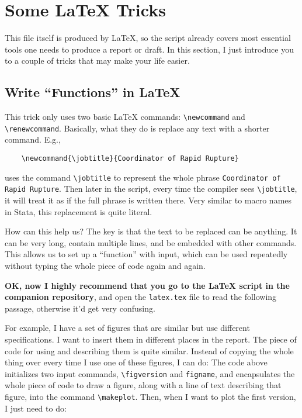 \section{Some {\LaTeX} Tricks}
This file itself is produced by {\LaTeX}, so the script already covers most essential tools one needs to produce a report or draft. In this section, I just introduce you to a couple of tricks that may make your life easier. 

\subsection{Write ``Functions'' in {\LaTeX}}
This trick only uses two basic {\LaTeX} commands: \verb|\newcommand| and \verb|\renewcommand|. Basically, what they do is replace any text with a shorter command. E.g., 
\begin{verbatim}
    \newcommand{\jobtitle}{Coordinator of Rapid Rupture}
\end{verbatim}
uses the command \verb|\jobtitle| to represent the whole phrase \verb|Coordinator of Rapid Rupture|. Then later in the script, every time the compiler sees \verb|\jobtitle|, it will treat it as if the full phrase is written there. Very similar to macro names in Stata, this replacement is quite literal. 

How can this help us? The key is that the text to be replaced can be anything. It can be very long, contain multiple lines, and be embedded with other commands. This allows us to set up a ``function'' with input, which can be used repeatedly without typing the whole piece of code again and again. 

\textbf{OK, now I highly recommend that you go to the {\LaTeX} script in the companion repository}, and open the \verb|latex.tex| file to read the following passage, otherwise it'd get very confusing.

For example, I have a set of figures that are similar but use different specifications. I want to insert them in different places in the report. The piece of code for using and describing them is quite similar. Instead of copying the whole thing over every time I use one of these figures, I can do:
\newcommand{\figversion}{}
\newcommand{\figname}{}
\newcommand{\makeplot}{
    The figure below maps the population share of people over 65 in each state, where states are drawn in \figname.
    \begin{figure}[H]
        \caption{\% Population >65yo Map, \figname}
        \begin{center}
            \texttt{[image: Output/Figures/map\\figversion.png]}
        \end{center}
    \end{figure}
}
The code above initializes two input commands, \verb|\figversion| and \verb|figname|, and encapsulates the whole piece of code to draw a figure, along with a line of text describing that figure, into the command \verb|\makeplot|. Then, when I want to plot the first version, I just need to do:

